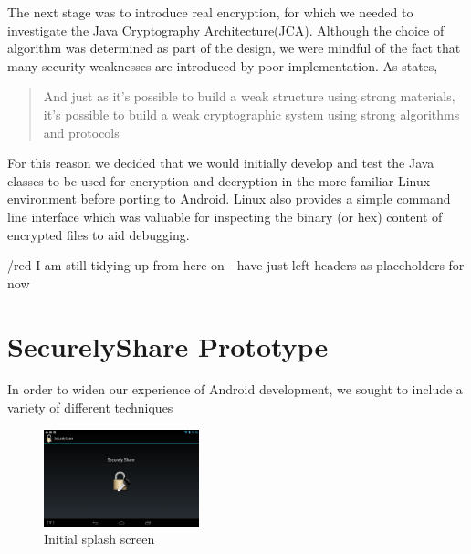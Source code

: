 The next stage was to introduce real encryption, for which we needed to investigate the Java Cryptography Architecture(JCA).  Although the choice of algorithm was determined as part of the design, we were mindful of the fact that  many security weaknesses are introduced by poor implementation. As \citet{schneier1998security} states,
\begin{quotation}
And just as it's possible to build a weak structure using strong materials, it's possible to build a weak cryptographic system using strong algorithms and protocols 
\end{quotation}  
For this reason we decided that we would initially develop and test the  Java classes to be used for encryption and decryption in the more familiar Linux environment before porting to Android.  Linux also provides a simple command line interface which was valuable for inspecting the binary (or hex) content of encrypted files to aid debugging.


/red {I am still tidying up from here on - have just left headers as placeholders for now}\\


\section{SecurelyShare Prototype}

In order to widen our experience of Android development, we sought to include a variety of different techniques

\begin{figure}[h!]
    \centering
    \includegraphics[width=0.4\textwidth]{SplashScreen}
    \caption{Initial splash screen }
    \label{fig:initial}
\end{figure}


